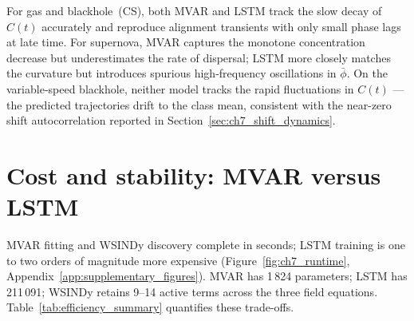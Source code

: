 For gas and blackhole~(CS), both MVAR and LSTM track the slow decay of
$C(t)$ accurately and reproduce alignment transients with only small phase
lags at late time.  For supernova, MVAR captures the monotone concentration
decrease but underestimates the rate of dispersal; LSTM more closely matches
the curvature but introduces spurious high-frequency oscillations in
$\bar{\phi}$.  On the variable-speed blackhole, neither model tracks the
rapid fluctuations in $C(t)$ --- the predicted trajectories drift to the
class mean, consistent with the near-zero shift autocorrelation reported in
Section~\ref{sec:ch7_shift_dynamics}.

\section{Cost and stability: MVAR versus LSTM}
\label{sec:ch7_cost_stability}

MVAR fitting and WSINDy discovery complete in seconds; LSTM training is
one to two orders of magnitude more expensive (Figure~\ref{fig:ch7_runtime},
Appendix~\ref{app:supplementary_figures}).  MVAR has 1\,824 parameters;
LSTM has 211\,091; WSINDy retains 9--14 active terms across the three field equations.
Table~\ref{tab:efficiency_summary} quantifies these trade-offs.

